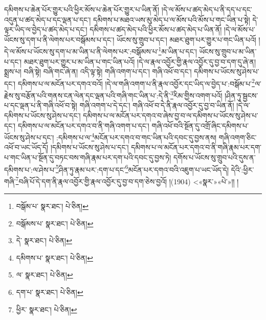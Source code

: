 དམིགས་པ་ཆེན་པོར་གྱུར་པའི་ཕྱིར་མོས་པ་ཆེན་པོར་གྱུར་པ་ཡིན་ནོ། །དེ་ལ་མོས་པ་ཚད་མེད་པ་ནི་དད་པ་དང་འདུན་པ་ཚད་མེད་པ་དང་ལྡན་པ་དང་། དམིགས་པ་མཐའ་ཡས་མུ་མེད་པ་ལ་མོས་པའི་མོས་པ་གང་ཡིན་པ་སྟེ། དེ་ལྟར་ཡིད་ལ་བྱེད་པ་ཚད་མེད་པ་དང་། དམིགས་པ་ཚད་མེད་པའི་ཕྱིར་མོས་པ་ཚད་མེད་པ་ཡིན་ནོ། །དེ་ལ་མོས་པ་ཡོངས་སུ་དག་པ་ནི་ལེགས་པར་བསྒོམས་པ་དང་། ཡོངས་སུ་གྲུབ་པ་དང་། མཐར་ཐུག་པར་གྱུར་པ་གང་ཡིན་པའོ། །དེ་ལ་མོས་པ་ཡོངས་སུ་དག་པ་མ་ཡིན་པ་ནི་ལེགས་པར་:བསྒོམས་པ་\footnote{བསྒོམ་པ་  སྣར་ཐང་།  པེ་ཅིན། }མ་ཡིན་པ་དང་། ཡོངས་སུ་གྲུབ་པ་མ་ཡིན་པ་དང་། མཐར་ཐུག་པར་གྱུར་པ་མ་ཡིན་པ་གང་ཡིན་པའོ། །དེ་ལ་རྣལ་འབྱོར་གྱི་རྣལ་འབྱོར་དུ་བྱ་བ་དག་དུ་ཞེ་ན། སྨྲས་པ། བཞི་སྟེ། བཞི་གང་ཞེ་ན། འདི་ལྟ་སྟེ། གཞི་འགག་པ་དང་། གཞི་འཕོ་བ་དང་། དམིགས་པ་ཡོངས་སུ་ཤེས་པ་དང་། དམིགས་པ་ལ་མངོན་པར་དགའ་བའོ། །དེ་ལ་གཞི་འགག་པ་ནི་རྣལ་འབྱོར་དང་ཡིད་ལ་བྱེད་པ་:བསྒོམ་པ་\footnote{བསྒོམས་པ་  སྣར་ཐང་།  པེ་ཅིན། }ལ་རྗེས་སུ་བརྩོན་པའི་གནས་ངན་ལེན་དང་ལྡན་པའི་གཞི་གང་ཡིན་པ་:དེ་ནི་\footnote{དེ་  སྣར་ཐང་།  པེ་ཅིན། }རིམ་གྱིས་འགག་པའོ། །ཤིན་ཏུ་སྦྱངས་པ་དང་ལྡན་པ་ནི་གཞི་འཕོ་བ་སྟེ། གཞི་འགག་པ་དེ་དང་། གཞི་འཕོ་བ་དེ་ནི་རྣལ་འབྱོར་དུ་བྱ་བ་ཡིན་ནོ། །དེ་ལ་དམིགས་པ་ཡོངས་སུ་ཤེས་པ་དང་། དམིགས་པ་ལ་མངོན་པར་དགའ་བ་ཞེས་བྱ་བ་ལ་དམིགས་པ་ཡོངས་སུ་ཤེས་པ་དང་། དམིགས་པ་ལ་མངོན་པར་དགའ་བ་ནི་གཞི་འགག་པ་དང་། གཞི་འཕོ་བའི་སྔོན་དུ་འགྲོ་ཞིང་དམིགས་པ་ཡོངས་སུ་ཤེས་པ་དང་། :དམིགས་པ་ལ་\footnote{དམིགས་པ་  སྣར་ཐང་།  པེ་ཅིན། }མངོན་པར་དགའ་བ་གང་ཡིན་པའི་དབང་དུ་བྱས་ནས། གཞི་འགག་ཅིང་འཕོ་བ་ཡང་ཡོད་དོ། །དམིགས་པ་ཡོངས་སུ་ཤེས་པ་དང་། དམིགས་པ་ལ་མངོན་པར་དགའ་བ་ནི་གཞི་རྣམ་པར་དག་པ་གང་ཡིན་པ་སྔོན་དུ་བཏང་བས་གཞི་རྣམ་པར་དག་པའི་དབང་དུ་བྱས་ཏེ། དགོས་པ་ཡོངས་སུ་གྲུབ་པའི་དུས་ན་དམིགས་པ་:ལ་ཤེས་པ་\footnote{ལ་  སྣར་ཐང་།  པེ་ཅིན། }ཤིན་ཏུ་རྣམ་པར་:དག་པ་དང་\footnote{དག་པ་  སྣར་ཐང་།  པེ་ཅིན། }མངོན་པར་དགའ་བའི་འཇུག་པ་ཡང་ཡོད་དེ། དེའི་:ཕྱིར་གཞི་\footnote{ཕྱིར་  སྣར་ཐང་།  པེ་ཅིན། }བཞི་པོ་དེ་དག་ནི་རྣལ་འབྱོར་གྱི་རྣལ་འབྱོར་དུ་བྱ་བ་དག་ཅེས་བྱའོ། །(1904) <«སྣར་»«པེ་»།། །

